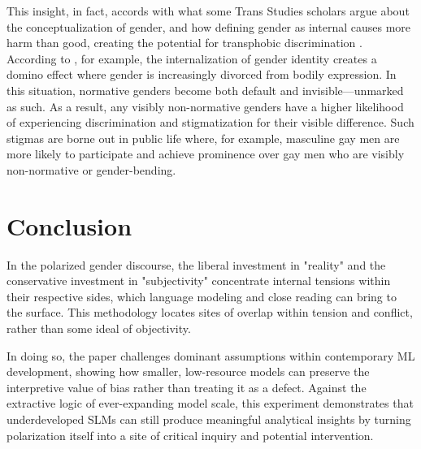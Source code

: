\documentclass[anonymous,review]{acmart}
\begin{document}
This insight, in fact, accords with what some Trans Studies scholars argue about the conceptualization of gender, and how defining gender as internal causes more harm than good, creating the potential for transphobic discrimination \citep{amin_2022,chu_2024}. According to \citet{amin_2022}, for example, the internalization of gender identity creates a domino effect where gender is increasingly divorced from bodily expression. In this situation, normative genders become both default and invisible---unmarked as such. As a result, any visibly non-normative genders have a higher likelihood of experiencing discrimination and stigmatization for their visible difference. Such stigmas are borne out in public life where, for example, masculine gay men are more likely to participate and achieve prominence over gay men who are visibly non-normative or gender-bending.

\section{Conclusion}

In the polarized gender discourse, the liberal investment in "reality" and the conservative investment in "subjectivity" concentrate internal tensions within their respective sides, which language modeling and close reading can bring to the surface. This methodology locates sites of overlap within tension and conflict, rather than some ideal of objectivity.

In doing so, the paper challenges dominant assumptions within contemporary ML development, showing how smaller, low-resource models can preserve the interpretive value of bias rather than treating it as a defect. Against the extractive logic of ever-expanding model scale, this experiment demonstrates that underdeveloped SLMs can still produce meaningful analytical insights by turning polarization itself into a site of critical inquiry and potential intervention.
\end{document}
